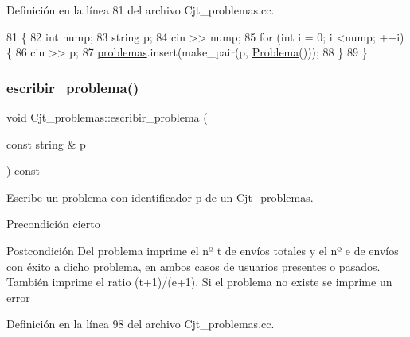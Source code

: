 Definición en la línea 81 del archivo Cjt\+\_\+problemas.\+cc.


\begin{DoxyCode}
81                                        \{
82       \textcolor{keywordtype}{int} nump;
83       \textcolor{keywordtype}{string} p;
84       cin >> nump;
85       \textcolor{keywordflow}{for} (\textcolor{keywordtype}{int} i = 0; i <nump; ++i) \{
86         cin >> p;
87         \mbox{\hyperlink{class_cjt__problemas_aad49222fb63517d7d7fc3d691f045cc5}{problemas}}.insert(make\_pair(p, \mbox{\hyperlink{class_problema}{Problema}}()));
88       \}
89     \}
\end{DoxyCode}
\mbox{\label{class_cjt__problemas_a4fbbf5935069783a5ced92c5b169c330}} 
\subsubsection{\texorpdfstring{escribir\+\_\+problema()}{escribir\_problema()}}
{\footnotesize\ttfamily void Cjt\+\_\+problemas\+::escribir\+\_\+problema (\begin{DoxyParamCaption}\item[{const string \&}]{p }\end{DoxyParamCaption}) const}



Escribe un problema con identificador p de un \mbox{\hyperlink{class_cjt__problemas}{Cjt\+\_\+problemas}}. 

\begin{DoxyPrecond}{Precondición}
cierto 
\end{DoxyPrecond}
\begin{DoxyPostcond}{Postcondición}
Del problema imprime el nº t de envíos totales y el nº e de envíos con éxito a dicho problema, en ambos casos de usuarios presentes o pasados. También imprime el ratio (t+1)/(e+1). Si el problema no existe se imprime un error 
\end{DoxyPostcond}


Definición en la línea 98 del archivo Cjt\+\_\+problemas.\+cc.


